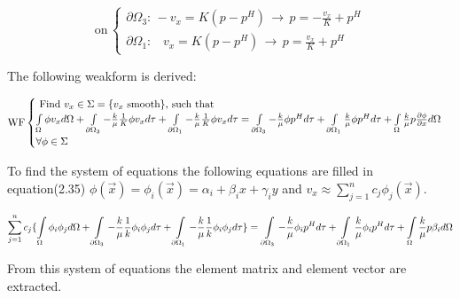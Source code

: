 \documentclass[a4paper]{report}
\begin{document}
\begin{equation}
\text{on}\,
\begin{cases}
\partial\Omega_3:\, -v_x=K(p-p^H) \,\rightarrow\, p=-\frac{v_x}{K}+p^H\\
\partial\Omega_1:\,\,\,\,\, v_x=K(p-p^H) \,\rightarrow\, p=\frac{v_x}{K}+p^H
\end{cases}
\end{equation}

The following weakform is derived:


\vspace{1mm}

\begin{equation}
\text{WF}
	\begin{cases}
	$ Find $v_x \in \Sigma = \{v_x \text{ smooth}\}$, such that$ \\
		\int\limits_{\Omega}\phi v_x d\Omega + \int\limits_{\partial \Omega_3}-\frac{k}{\mu}\frac{1}{K}\phi v_xd\tau + \int\limits_{\partial \Omega_1}-\frac{k}{\mu}\frac{1}{K}\phi v_x d\tau 
		= \int\limits_{\partial \Omega_3}-\frac{k}{\mu}\phi p^H d\tau +\int\limits_{\partial \Omega_1}\frac{k}{\mu}\phi p^H d\tau + \int\limits_{\Omega}\frac{k}{\mu}p\frac{\partial \phi}{\partial x}d\Omega \\
		\forall \phi \in \Sigma
	\end{cases}
\end{equation}

\vspace{1mm}

To find the system of equations the following equations are filled in equation(2.35)  
$\phi(\vec{x})=\phi_i(\vec{x})= \alpha_i+\beta_i x+\gamma_i y$ and  $v_x\approx \sum\limits_{j=1}^{n}c_j\phi_j(\vec{x})$.

\begin{equation}\label{SoQ2}
	\sum_{j=1}^{n}c_j\{\int\limits_{\Omega}\phi_i\phi_j d\Omega +\int\limits_{\partial\Omega_3}-\frac{k}{\mu}\frac{1}{k}\phi_i\phi_j d\tau + \int\limits_{\partial\Omega_1}-\frac{k}{\mu}\frac{1}{k}\phi_i\phi_j d\tau\} = \\
	\int\limits_{\partial\Omega_3}-\frac{k}{\mu}\phi_i p^H d\tau +\int\limits_{\partial\Omega_1}\frac{k}{\mu}\phi_i p^H d\tau + \int\limits_{\Omega}\frac{k}{\mu}p\beta_id\Omega 
\end{equation}

From this system of equations the element matrix and element vector are extracted.
\end{document}
